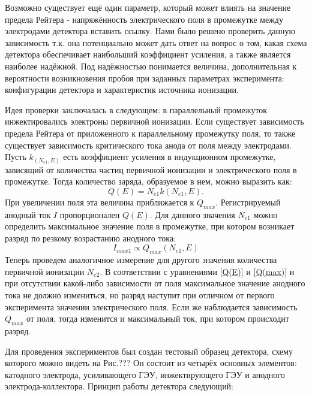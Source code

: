 \par Возможно существует ещё один параметр, который может влиять на значение предела Рейтера - напряжённость электрического поля в промежутке между электродами детектора {вставить ссылку}. Нами было решено проверить данную зависимость т.к. она потенциально может дать ответ на вопрос о том, какая схема детектора обеспечивает наибольший коэффициент усиления, а также является наиболее надёжной. Под надёжностью понимается величина, дополнительная к вероятности возникновения пробоя при заданных параметрах эксперимента: конфигурации детектора и характеристик источника ионизации. 
\par Идея проверки заключалась в следующем: в параллельный промежуток инжектировались электроны первичной ионизации. Если существует зависимость предела Рейтера от приложенного к параллельному промежутку поля, то также существует зависимость критического тока анода от поля между электродами. Пусть $k_(N_{e1},E)$ есть коэффициент усиления в индукционном промежутке, зависящий от количества частиц первичной ионизации и электрического поля в промежутке. Тогда количество заряда, образуемое в нем, можно выразить как: 
\begin{equation}
Q(E) = N_{e1} k(N_{e1},E).
\label{Q(E)}
\end{equation}
При увеличении поля эта величина приближается к $Q_{max}$. Регистрируемый анодный ток $I$ пропорционален $Q(E)$. Для данного значения $N_{e1}$ можно определить максимальное значение поля в промежутке, при котором возникает разряд по резкому возрастанию анодного тока:
\begin{equation}
 I_{max1} \propto Q_{max}(N_{e1},E)
\end{equation}
Теперь проведем аналогичное измерение для другого значения количества первичной ионизации $N_{e2}$. В соответствии с уравнениями \ref{Q(E)} и \ref{Q(max)} и при отсутствии какой-либо зависимости от поля максимальное значение анодного тока не должно измениться, но разряд наступит при отличном от первого эксперимента значении электрического поля. Если же наблюдается зависимость $Q_{max}$ от поля, тогда изменится и максимальный ток, при котором происходит разряд.
\par Для проведения экспериментов был создан тестовый образец детектора, схему которого можно видеть на Рис.??? Он состоит из четырёх основных элементов: катодного электрода, усиливающего ГЭУ, инжектирующего ГЭУ и анодного электрода-коллектора. Принцип работы детектора следующий: 
